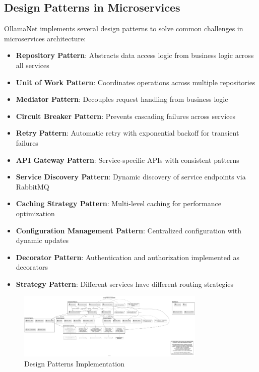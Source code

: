 \subsection{Design Patterns in Microservices}

OllamaNet implements several design patterns to solve common challenges in microservices architecture:

\begin{itemize}
    \item \textbf{Repository Pattern}: Abstracts data access logic from business logic across all services
    \item \textbf{Unit of Work Pattern}: Coordinates operations across multiple repositories
    \item \textbf{Mediator Pattern}: Decouples request handling from business logic
    \item \textbf{Circuit Breaker Pattern}: Prevents cascading failures across services
    \item \textbf{Retry Pattern}: Automatic retry with exponential backoff for transient failures
    \item \textbf{API Gateway Pattern}: Service-specific APIs with consistent patterns
    \item \textbf{Service Discovery Pattern}: Dynamic discovery of service endpoints via RabbitMQ
    \item \textbf{Caching Strategy Pattern}: Multi-level caching for performance optimization
    \item \textbf{Configuration Management Pattern}: Centralized configuration with dynamic updates
    \item \textbf{Decorator Pattern}: Authentication and authorization implemented as decorators
    \item \textbf{Strategy Pattern}: Different services have different routing strategies
\end{itemize}

\begin{figure}
    \centering
    \includegraphics[width=0.8\textwidth]{./Chapter02/figures/Design_Patterns.png}
    \caption{Design Patterns Implementation}
    \label{fig:design-patterns}
\end{figure}

